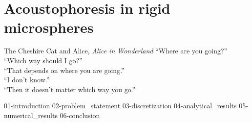 \chapter{\label{ch:bubbles}Acoustophoresis in rigid microspheres}

\begin{frontquote}{The Cheshire Cat and Alice, \emph{Alice in Wonderland}}
  ``Where are you going?'' \\
``Which way should I go?'' \\
``That depends on where you are going.'' \\
``I don’t know.'' \\
``Then it doesn’t matter which way you go.''\\
\end{frontquote}


{01-introduction}
{02-problem_statement}
{03-discretization}
{04-analytical_results}
{05-numerical_results}
{06-conclusion}

